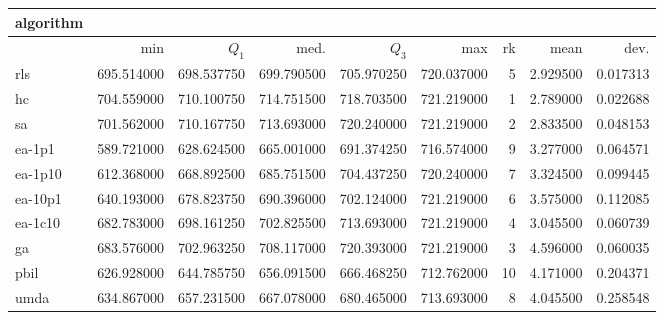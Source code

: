 \begin{tabular}{@{}l*{5}{>{{}}N{3}{2}}>{{}}N{2}{0}N{1}{3}N{1}{3}@{}}
\toprule
{algorithm} &  &  \\
\midrule
& {min} & {$Q_1$} & {med.} & {$Q_3$} & {max} & {rk} & {mean} & {dev.} \\
\midrule
rls & 695.514000 & 698.537750 & 699.790500 & 705.970250 & 720.037000 & 5 & 2.929500 & 0.017313 \\
 hc & {\color{blue}} 704.559000 & 710.100750 & {\color{blue}} 714.751500 & 718.703500 & {\color{blue}} 721.219000 & 1 & 2.789000 & 0.022688 \\
 sa & 701.562000 & {\color{blue}} 710.167750 & 713.693000 & 720.240000 & {\color{blue}} 721.219000 & 2 & 2.833500 & 0.048153 \\
 ea-1p1 & 589.721000 & 628.624500 & 665.001000 & 691.374250 & 716.574000 & 9 & 3.277000 & 0.064571 \\
 ea-1p10 & 612.368000 & 668.892500 & 685.751500 & 704.437250 & 720.240000 & 7 & 3.324500 & 0.099445 \\
 ea-10p1 & 640.193000 & 678.823750 & 690.396000 & 702.124000 & {\color{blue}} 721.219000 & 6 & 3.575000 & 0.112085 \\
 ea-1c10 & 682.783000 & 698.161250 & 702.825500 & 713.693000 & {\color{blue}} 721.219000 & 4 & 3.045500 & 0.060739 \\
 ga & 683.576000 & 702.963250 & 708.117000 & {\color{blue}} 720.393000 & {\color{blue}} 721.219000 & 3 & 4.596000 & 0.060035 \\
 pbil & 626.928000 & 644.785750 & 656.091500 & 666.468250 & 712.762000 & 10 & 4.171000 & 0.204371 \\
 umda & 634.867000 & 657.231500 & 667.078000 & 680.465000 & 713.693000 & 8 & 4.045500 & 0.258548 \\
 \bottomrule
\end{tabular}
